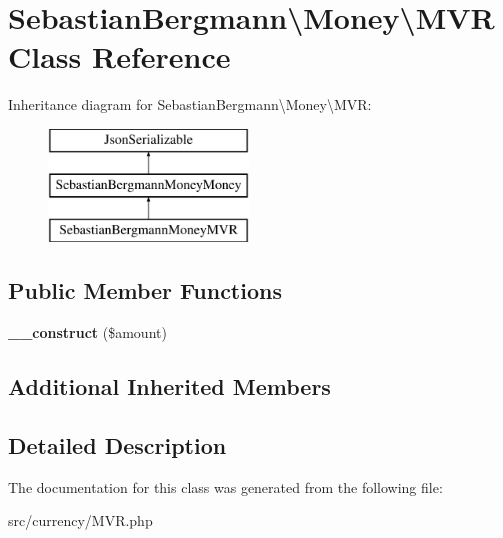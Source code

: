 \hypertarget{classSebastianBergmann_1_1Money_1_1MVR}{}\section{Sebastian\+Bergmann\textbackslash{}Money\textbackslash{}M\+V\+R Class Reference}
\label{classSebastianBergmann_1_1Money_1_1MVR}
Inheritance diagram for Sebastian\+Bergmann\textbackslash{}Money\textbackslash{}M\+V\+R\+:\begin{figure}[H]
\begin{center}
\leavevmode
\includegraphics[height=3.000000cm]{classSebastianBergmann_1_1Money_1_1MVR}
\end{center}
\end{figure}
\subsection*{Public Member Functions}
\begin{DoxyCompactItemize}
\item 
\hypertarget{classSebastianBergmann_1_1Money_1_1MVR_a4fdbf0af917fb2b96866284dc9c96d84}{}{\bfseries \+\_\+\+\_\+construct} (\$amount)\label{classSebastianBergmann_1_1Money_1_1MVR_a4fdbf0af917fb2b96866284dc9c96d84}

\end{DoxyCompactItemize}
\subsection*{Additional Inherited Members}


\subsection{Detailed Description}


The documentation for this class was generated from the following file\+:\begin{DoxyCompactItemize}
\item 
src/currency/M\+V\+R.\+php\end{DoxyCompactItemize}
